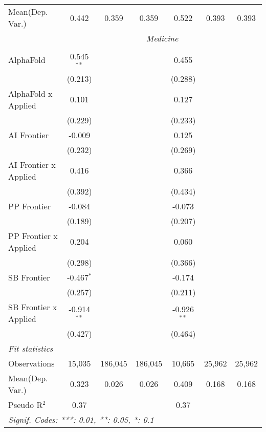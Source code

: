 \begin{tabular}{lcccccc}
Mean(Dep. Var.) & 0.442 & 0.359 & 0.359 & 0.522 & 0.393 & 0.393 \\
 & \multicolumn{6}{c}{\textit{Medicine}} \\ \\
   AlphaFold             & 0.545$^{**}$  &         &         & 0.455         &        &   \\   
                         & (0.213)       &         &         & (0.288)       &        &   \\   
   AlphaFold x Applied   & 0.101         &         &         & 0.127         &        &   \\   
                         & (0.229)       &         &         & (0.233)       &        &   \\   
   AI Frontier           & -0.009        &         &         & 0.125         &        &   \\   
                         & (0.232)       &         &         & (0.269)       &        &   \\   
   AI Frontier x Applied & 0.416         &         &         & 0.366         &        &   \\   
                         & (0.392)       &         &         & (0.434)       &        &   \\   
   PP Frontier           & -0.084        &         &         & -0.073        &        &   \\   
                         & (0.189)       &         &         & (0.207)       &        &   \\   
   PP Frontier x Applied & 0.204         &         &         & 0.060         &        &   \\   
                         & (0.298)       &         &         & (0.366)       &        &   \\   
   SB Frontier           & -0.467$^{*}$  &         &         & -0.174        &        &   \\   
                         & (0.257)       &         &         & (0.211)       &        &   \\   
   SB Frontier x Applied & -0.914$^{**}$ &         &         & -0.926$^{**}$ &        &   \\   
                         & (0.427)       &         &         & (0.464)       &        &   \\   
   \midrule
   \emph{Fit statistics}\\
   Observations          & 15,035        & 186,045 & 186,045 & 10,665        & 25,962 & 25,962\\  
Mean(Dep. Var.) & 0.323 & 0.026 & 0.026 & 0.409 & 0.168 & 0.168 \\
   Pseudo R$^2$          & 0.37          &         &         & 0.37          &        & \\  
   \midrule \midrule
   \multicolumn{7}{l}{\emph{Signif. Codes: ***: 0.01, **: 0.05, *: 0.1}}\\
\end{tabular}
\par\endgroup
